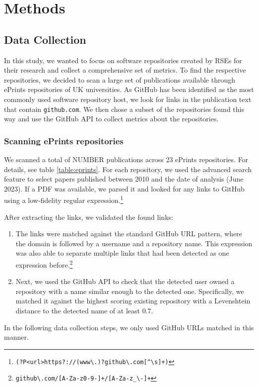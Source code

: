 \documentclass[10pt,a4paper]{scrartcl}
\begin{document}
\section{Methods}

\subsection*{Data Collection}

In this study, we wanted to focus on software repositories created by RSEs for their research and collect a comprehensive set of metrics.
To find the respective repositories, we decided to scan a large set of publications available through ePrints repositories of UK universities.
As GitHub has been identified as the most commonly used software repository host, we look for links in the publication text that contain \verb|github.com|.
We then chose a subset of the repositories found this way and use the GitHub API to collect metrics about the repositories.

\subsubsection*{Scanning ePrints repositories}

We scanned a total of NUMBER publications across 23 ePrints repositories. For details, see table \ref{table:eprints}.
For each repository, we used the advanced search feature to select papers published between 2010 and the date of analysis (June 2023).
If a PDF was available, we parsed it and looked for any links to GitHub using a low-fidelity regular expression.\footnote{\verb|(?P<url>https?://(www\.)?github\.com[^\s]+)|}

After extracting the links, we validated the found links:
\begin{enumerate}
    \item The links were matched against the standard GitHub URL pattern, where the domain is followed by a username and a repository name. This expression was also able to separate multiple links that had been detected as one expression before.\footnote{\verb|github\.com/[A-Za-z0-9-]+/[A-Za-z_\-]+|}
    \item Next, we used the GitHub API to check that the detected user owned a repository with a name similar enough to the detected one. Specifically, we matched it against the highest scoring existing repository with a Levenshtein distance to the detected name of at least $0.7$.
\end{enumerate}
In the following data collection steps, we only used GitHub URLs matched in this manner.
\end{document}
